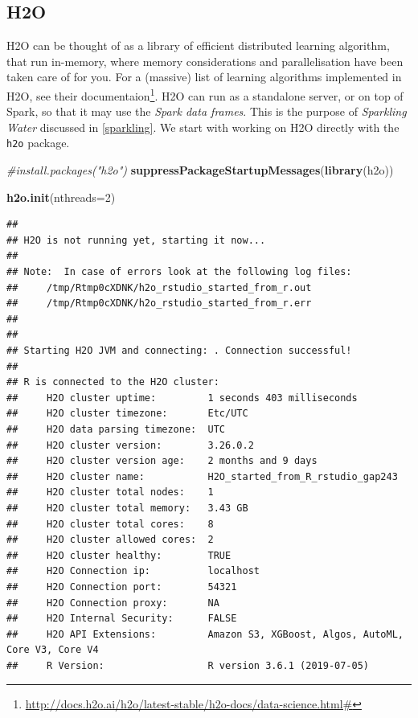 \documentclass[]{book}
\newenvironment{Shaded}{\begin{snugshade}}{\end{snugshade}}
\newcommand{\CommentTok}[1]{\textcolor[rgb]{0.56,0.35,0.01}{\textit{#1}}}
\newcommand{\DataTypeTok}[1]{\textcolor[rgb]{0.13,0.29,0.53}{#1}}
\newcommand{\DecValTok}[1]{\textcolor[rgb]{0.00,0.00,0.81}{#1}}
\newcommand{\KeywordTok}[1]{\textcolor[rgb]{0.13,0.29,0.53}{\textbf{#1}}}
\newcommand{\NormalTok}[1]{#1}
\renewcommand{\href}[2]{#2\footnote{\url{#1}}}
\theoremstyle{definition}
\theoremstyle{definition}
\theoremstyle{definition}
\theoremstyle{remark}
\begin{document}
\hypertarget{h2o}{%
\subsection{H2O}\label{h2o}}

H2O can be thought of as a library of efficient distributed learning algorithm, that run in-memory, where memory considerations and parallelisation have been taken care of for you.
For a (massive) list of learning algorithms implemented in H2O, see \href{http://docs.h2o.ai/h2o/latest-stable/h2o-docs/data-science.html\#}{their documentaion}.
H2O can run as a standalone server, or on top of Spark, so that it may use the \emph{Spark data frames}. This is the purpose of \emph{Sparkling Water} discussed in \ref{sparkling}.
We start with working on H2O directly with the \texttt{h2o} package.

\begin{Shaded}
\begin{Highlighting}[]
\CommentTok{#install.packages("h2o") }
\KeywordTok{suppressPackageStartupMessages}\NormalTok{(}\KeywordTok{library}\NormalTok{(h2o))}

\KeywordTok{h2o.init}\NormalTok{(}\DataTypeTok{nthreads=}\DecValTok{2}\NormalTok{) }
\end{Highlighting}
\end{Shaded}

\begin{verbatim}
## 
## H2O is not running yet, starting it now...
## 
## Note:  In case of errors look at the following log files:
##     /tmp/Rtmp0cXDNK/h2o_rstudio_started_from_r.out
##     /tmp/Rtmp0cXDNK/h2o_rstudio_started_from_r.err
## 
## 
## Starting H2O JVM and connecting: . Connection successful!
## 
## R is connected to the H2O cluster: 
##     H2O cluster uptime:         1 seconds 403 milliseconds 
##     H2O cluster timezone:       Etc/UTC 
##     H2O data parsing timezone:  UTC 
##     H2O cluster version:        3.26.0.2 
##     H2O cluster version age:    2 months and 9 days  
##     H2O cluster name:           H2O_started_from_R_rstudio_gap243 
##     H2O cluster total nodes:    1 
##     H2O cluster total memory:   3.43 GB 
##     H2O cluster total cores:    8 
##     H2O cluster allowed cores:  2 
##     H2O cluster healthy:        TRUE 
##     H2O Connection ip:          localhost 
##     H2O Connection port:        54321 
##     H2O Connection proxy:       NA 
##     H2O Internal Security:      FALSE 
##     H2O API Extensions:         Amazon S3, XGBoost, Algos, AutoML, Core V3, Core V4 
##     R Version:                  R version 3.6.1 (2019-07-05)
\end{verbatim}
\end{document}
